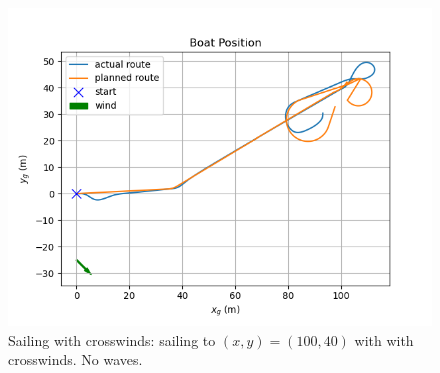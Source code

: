 \documentclass[conference]{IEEEtran}
\begin{document}
\begin{figure}
                  \includegraphics[trim={0.5cm 0.25cm 1.25cm 0.75cm },clip]{documents/final_pres_figs/right_to_wind_to_40_40_pos.png}
    \caption{Sailing with crosswinds: sailing to \((x,y) = (100,40)\) with with crosswinds. No waves.}
    \label{fig:sail_right_wind}
\end{figure}
\end{document}
